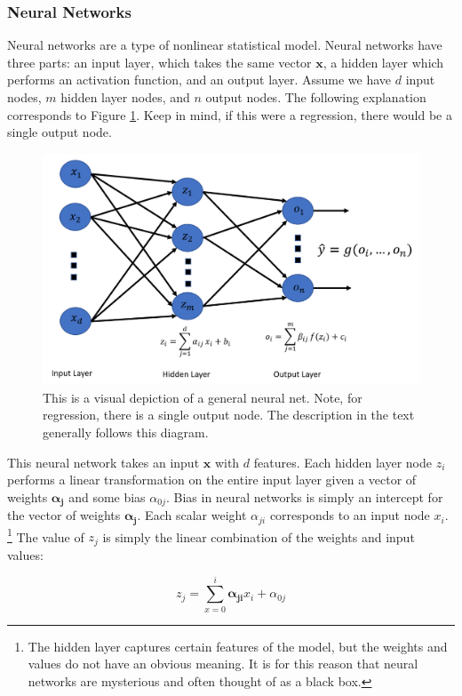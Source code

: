 \documentclass[12pt]{article}
\begin{document}
\subsubsection{Neural Networks}
Neural networks are a type of nonlinear statistical model. Neural networks have three parts: an input layer, which takes the same vector $\textbf{x}$, a hidden layer which performs an activation function, and an output layer. Assume we have $d$ input nodes, $m$ hidden layer nodes, and $n$ output nodes. The following explanation corresponds to Figure \ref{neuralnet}. Keep in mind, if this were a regression, there would be a single output node.

\begin{figure}[ht]
	\centering
	\includegraphics[width=.85\textwidth]{NeuralNetwork.png}
	\caption{This is a visual depiction of a general neural net. Note, for regression, there is a single output node. The description in the text generally follows this diagram. \cite{neural}}
	\label{neuralnet}
\end{figure}

This neural network takes an input $\textbf{x}$ with $d$ features. Each hidden layer node $z_i$ performs a linear transformation on the entire input layer given a vector of weights $\boldsymbol{\alpha_j}$ and some bias $\alpha_{0j}$. Bias in neural networks is simply an intercept for the vector of weights $\boldsymbol{\alpha_j}$. Each scalar weight $\alpha_{ji}$ corresponds to an input node $x_i$. \footnote{The hidden layer captures certain features of the model, but the weights and values do not have an obvious meaning. It is for this reason that neural networks are mysterious and often thought of as a black box.} The value of $z_j$ is simply the linear combination of the weights and input values:

$$z_j = \sum_{x=0}^{i}\boldsymbol{\alpha_{ji}} x_i + \alpha_{0j}$$
\end{document}
